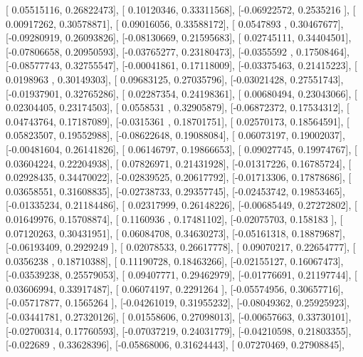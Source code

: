 \documentclass{article}
\begin{document}
       [ 0.05515116,  0.26822473],
       [ 0.10120346,  0.33311568],
       [-0.06922572,  0.2535216 ],
       [ 0.00917262,  0.30578871],
       [ 0.09016056,  0.33588172],
       [ 0.0547893 ,  0.30467677],
       [-0.09280919,  0.26093826],
       [-0.08130669,  0.21595683],
       [ 0.02745111,  0.34404501],
       [-0.07806658,  0.20950593],
       [-0.03765277,  0.23180473],
       [-0.0355592 ,  0.17508464],
       [-0.08577743,  0.32755547],
       [-0.00041861,  0.17118009],
       [-0.03375463,  0.21415223],
       [ 0.0198963 ,  0.30149303],
       [ 0.09683125,  0.27035796],
       [-0.03021428,  0.27551743],
       [-0.01937901,  0.32765286],
       [ 0.02287354,  0.24198361],
       [ 0.00680494,  0.23043066],
       [ 0.02304405,  0.23174503],
       [ 0.0558531 ,  0.32905879],
       [-0.06872372,  0.17534312],
       [ 0.04743764,  0.17187089],
       [-0.0315361 ,  0.18701751],
       [ 0.02570173,  0.18564591],
       [ 0.05823507,  0.19552988],
       [-0.08622648,  0.19088084],
       [ 0.06073197,  0.19002037],
       [-0.00481604,  0.26141826],
       [ 0.06146797,  0.19866653],
       [ 0.09027745,  0.19974767],
       [ 0.03604224,  0.22204938],
       [ 0.07826971,  0.21431928],
       [-0.01317226,  0.16785724],
       [ 0.02928435,  0.34470022],
       [-0.02839525,  0.20617792],
       [-0.01713306,  0.17878686],
       [ 0.03658551,  0.31608835],
       [-0.02738733,  0.29357745],
       [-0.02453742,  0.19853465],
       [-0.01335234,  0.21184486],
       [ 0.02317999,  0.26148226],
       [-0.00685449,  0.27272802],
       [ 0.01649976,  0.15708874],
       [ 0.1160936 ,  0.17481102],
       [-0.02075703,  0.158183  ],
       [ 0.07120263,  0.30431951],
       [ 0.06084708,  0.34630273],
       [-0.05161318,  0.18879687],
       [-0.06193409,  0.2929249 ],
       [ 0.02078533,  0.26617778],
       [ 0.09070217,  0.22654777],
       [ 0.0356238 ,  0.18710388],
       [ 0.11190728,  0.18463266],
       [-0.02155127,  0.16067473],
       [-0.03539238,  0.25579053],
       [ 0.09407771,  0.29462979],
       [-0.01776691,  0.21197744],
       [ 0.03606994,  0.33917487],
       [ 0.06074197,  0.2291264 ],
       [-0.05574956,  0.30657716],
       [-0.05717877,  0.1565264 ],
       [-0.04261019,  0.31955232],
       [-0.08049362,  0.25925923],
       [-0.03441781,  0.27320126],
       [ 0.01558606,  0.27098013],
       [-0.00657663,  0.33730101],
       [-0.02700314,  0.17760593],
       [-0.07037219,  0.24031779],
       [-0.04210598,  0.21803355],
       [-0.022689  ,  0.33628396],
       [-0.05868006,  0.31624443],
       [ 0.07270469,  0.27908845],
\end{document}
